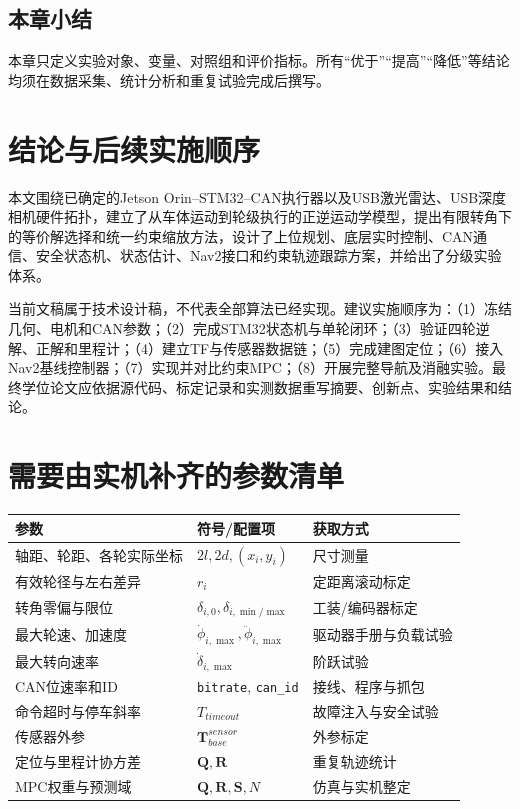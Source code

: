 \documentclass[UTF8,openany,12pt,a4paper]{ctexrep}
\begin{document}
\section{本章小结}
本章只定义实验对象、变量、对照组和评价指标。所有“优于”“提高”“降低”等结论均须在数据采集、统计分析和重复试验完成后撰写。

\chapter{结论与后续实施顺序}
本文围绕已确定的Jetson Orin--STM32--CAN执行器以及USB激光雷达、USB深度相机硬件拓扑，建立了从车体运动到轮级执行的正逆运动学模型，提出有限转角下的等价解选择和统一约束缩放方法，设计了上位规划、底层实时控制、CAN通信、安全状态机、状态估计、Nav2接口和约束轨迹跟踪方案，并给出了分级实验体系。

当前文稿属于技术设计稿，不代表全部算法已经实现。建议实施顺序为：（1）冻结几何、电机和CAN参数；（2）完成STM32状态机与单轮闭环；（3）验证四轮逆解、正解和里程计；（4）建立TF与传感器数据链；（5）完成建图定位；（6）接入Nav2基线控制器；（7）实现并对比约束MPC；（8）开展完整导航及消融实验。最终学位论文应依据源代码、标定记录和实测数据重写摘要、创新点、实验结果和结论。

\appendix
\chapter{需要由实机补齐的参数清单}
\begin{longtable}{p{4.3cm}p{4.0cm}p{5.2cm}}
\toprule 参数 & 符号/配置项 & 获取方式\\ \midrule
轴距、轮距、各轮实际坐标 & $2l,2d,(x_i,y_i)$ & 尺寸测量\\
有效轮径与左右差异 & $r_i$ & 定距离滚动标定\\
转角零偏与限位 & $\delta_{i,0},\delta_{i,\min/\max}$ & 工装/编码器标定\\
最大轮速、加速度 & $\dot\phi_{i,\max},\ddot\phi_{i,\max}$ & 驱动器手册与负载试验\\
最大转向速率 & $\dot\delta_{i,\max}$ & 阶跃试验\\
CAN位速率和ID & \texttt{bitrate}, \texttt{can\_id} & 接线、程序与抓包\\
命令超时与停车斜率 & $T_{timeout}$ & 故障注入与安全试验\\
传感器外参 & $\bm T_{base}^{sensor}$ & 外参标定\\
定位与里程计协方差 & $\bm Q,\bm R$ & 重复轨迹统计\\
MPC权重与预测域 & $\bm Q,\bm R,\bm S,N$ & 仿真与实机整定\\ \bottomrule
\end{longtable}
\end{document}
